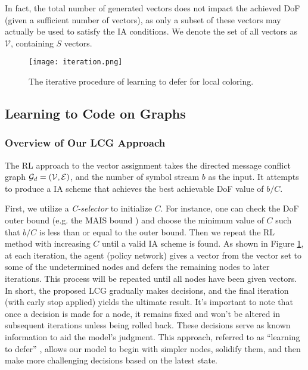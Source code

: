 \documentclass[a4paper,journal]{IEEEtran}
\begin{document}
In fact, the total number of generated vectors does not impact the achieved DoF (given a sufficient number of vectors), as only a subset of these vectors may actually be used to satisfy the IA conditions. We denote the set of all vectors as $\mathcal{V}$, containing $S$ vectors.

\begin{figure}[h]
\begin{center}
{%
 \texttt{[image: iteration.png]}}  
\end{center}
   \caption{The iterative procedure of learning to defer for local coloring.}
   \label{iteration}
\end{figure}

\subsection{Learning to Code on Graphs}
\subsubsection{Overview of Our LCG Approach}\label{overview_LCG}
The RL approach to the vector assignment takes the directed message conflict graph ${\mathcal{G}}_d=({\mathcal{V}}, {\mathcal{E}})$, and the number of symbol stream $b$ as the input. It attempts to produce a IA scheme that achieves the best achievable DoF value of $b/C$.

First, we utilize a \textit{C-selector} to initialize $C$. For instance, one can check the DoF outer bound (e.g. the MAIS bound \cite{bar2011index}) and choose the minimum value of $C$ such that $b/C$ is less than or equal to the outer bound. Then we repeat the RL method with increasing $C$ until a valid IA scheme is found. As shown in Figure \ref{iteration}, at each iteration, the agent (policy network) gives a vector from the vector set to some of the undetermined nodes and defers the remaining nodes to later iterations. This process will be repeated until all nodes have been given vectors. In short, the proposed LCG gradually makes decisions, and the final iteration (with early stop applied) yields the ultimate result. It's important to note that once a decision is made for a node, it remains fixed and won't be altered in subsequent iterations unless being rolled back. These decisions serve as known information to aid the model's judgment. This approach, referred to as ``learning to defer'' \cite{lwd}, allows our model to begin with simpler nodes, solidify them, and then make more challenging decisions based on the latest state.
\end{document}
